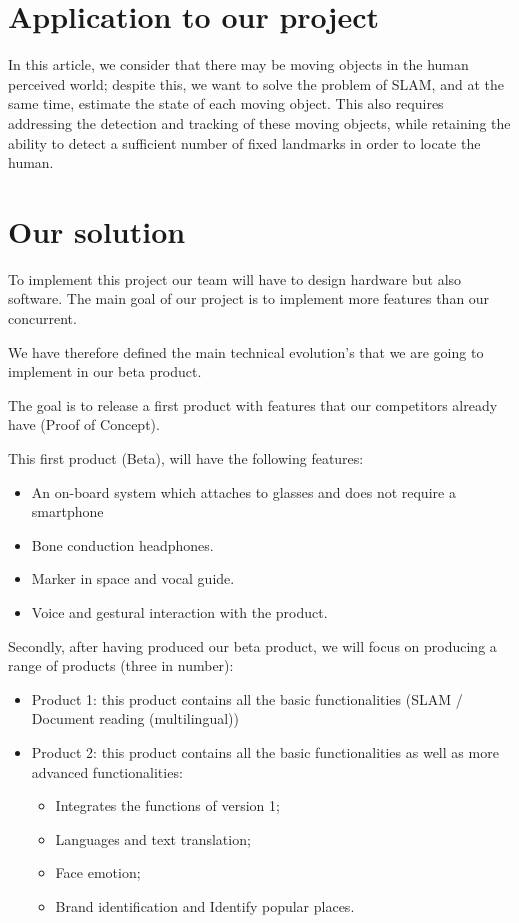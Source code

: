 \documentclass[conference,compsoc]{IEEEtran}
\begin{document}
\section{Application to our project}
In this article, we consider that there may be moving objects in the human perceived world; despite this, we want to solve the problem of SLAM, and at the same time, estimate the state of each moving object. This also requires addressing the detection and tracking of these moving objects, while retaining the ability to detect a sufficient number of fixed landmarks in order to locate the human.

\section{Our solution}
To implement this project our team will have to design hardware but also software. The main goal of our project is to implement more features than our concurrent.

We have therefore defined the main technical evolution's that we are going to implement in our beta product.

The goal is to release a first product with features that our competitors already have (Proof of Concept).

This first product (Beta), will have the following features:
\begin{itemize}
\item An on-board system which attaches to glasses and does not require a smartphone
\item Bone conduction headphones.
\item Marker in space and vocal guide.
\item Voice and gestural interaction with the product.
\end{itemize}

Secondly, after having produced our beta product, we will focus on producing a range of products (three in number):
\begin{itemize}
\item Product 1: this product contains all the basic functionalities (SLAM / Document reading (multilingual))
\item Product 2: this product contains all the basic functionalities as well as more advanced functionalities:
\begin{itemize}
    \item Integrates the functions of version 1;
    \item Languages and text translation;
    \item Face emotion;
    \item Brand identification and Identify popular places.
    \end{itemize}
\end{itemize}
\end{document}
